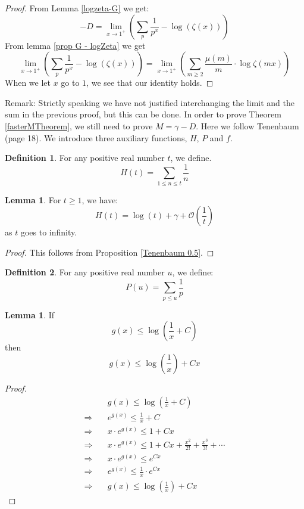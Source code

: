 \documentclass{article}
\theoremstyle{definition}
\newtheorem{definition}{Definition}[section]
\newtheorem{lemma}[theorem]{Lemma}
\theoremstyle{remark}
\begin{document}
\begin{proof}
From Lemma \ref{logzeta-G} we get:
$$-D=\lim_{x\rightarrow 1^+}\left(\sum_p\frac{1}{p^x}-\log(\zeta(x))  \right)$$
From lemma \ref{prop G - logZeta} we get
$$\lim_{x\rightarrow 1^+}\left(\sum_p\frac{1}{p^x}-\log(\zeta(x))  \right)=\lim_{x \rightarrow 1^+} \left(\sum_{m\geq 2}\frac{\mu(m)}{m}\cdot \log \zeta(mx) \right)$$
When we let $x$ go to $1$, we see that our identity holds.
\end{proof}
Remark: Strictly speaking we have not justified interchanging the limit and the sum in the previous proof, but this can be done.
\newline
In order to prove Theorem \ref{fasterMTheorem}, we still need to prove $M=\gamma - D$. Here we follow Tenenbaum (page 18). We introduce three auxiliary functions, $H$, $P$ and $f$.
\begin{definition}\label{defH(t)}
For any positive real number $t$, we define.
$$H(t)=\sum_{1\leq n \leq t}\frac{1}{n}$$
\end{definition}
\begin{lemma}
For $t\geq1$, we have:
$$H(t)=\log(t)+\gamma+\mathcal{O}(\frac{1}{t})$$
as $t$ goes to infinity.
\end{lemma}
\begin{proof}
This follows from Proposition \ref{Tenenbaum 0.5}.
\end{proof}
\begin{definition}\label{defP(u)}
For any positive real number $u$, we define:
$$P(u)=\sum_{p\leq u}\frac{1}{p}$$
\end{definition}
\begin{lemma} \label{alex1}
If $$g(x) \leq \log \left(\frac{1}{x} + C\right)$$ then $$g(x) \leq \log \left(\frac{1}{x}\right) + Cx$$
\end{lemma}
\begin{proof}
\begin{equation}
\begin{split}
& g(x) \leq \log\left(\frac{1}{x} + C\right) \\
\Rightarrow \quad & e^{g(x)} \leq \frac{1}{x} + C \\
\Rightarrow \quad& x \cdot e^{g(x)} \leq 1 + Cx \\
\Rightarrow \quad & x \cdot e^{g(x)} \leq 1 + Cx + \frac{x^2}{2!} + \frac{x^3}{3!} + \cdots \\
\Rightarrow \quad & x \cdot e^{g(x)} \leq e^{Cx} \\
\Rightarrow \quad  & e^{g(x)} \leq \frac{1}{x} \cdot e^{Cx} \\
\Rightarrow \quad & g(x) \leq \log \left(\frac{1}{x}\right) + Cx
\end{split}
\end{equation}
\end{proof}
\end{document}
